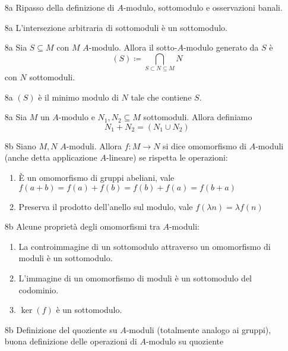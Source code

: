 \documentclass[italian]{article}
\begin{document}
    \begin{enumerate}
      \item[8a] Ripasso della definizione di $A$-modulo, sottomodulo e osservazioni 
        banali.
      \item[8a] L'intersezione arbitraria di sottomoduli è un sottomodulo.
      \item[8a] Sia $S \subseteq M$ con $M$ $A$-modulo. Allora il
        sotto-$A$-modulo generato da $S$ è 
            \begin{equation*}
              (S) \coloneqq \bigcap_{S \subset N \subseteq M} N
            \end{equation*}
        con $N$ sottomoduli. 
      \item[8a] $(S)$ è il minimo modulo di $N$ tale che contiene $S$.
      \item[8a] Sia $M$ un $A$-modulo e $N_1, N_2 \subseteq M$ sottomoduli.
        Allora definiamo 
        \begin{equation*}
          N_1 + N_2 = (N_1 \cup N_2)
        \end{equation*}
      \item[8b] Siano $M, N$ $A$-moduli. Allora $f \colon M \to N$ si dice
        omomorfismo di $A$-moduli (anche detta applicazione $A$-lineare) 
        se rispetta le operazioni:
        \begin{enumerate}
          \item È un omomorfismo di gruppi abeliani, vale 
                $f(a+b) = f(a)+f(b) = f(b)+f(a) = f(b+a)$
          \item Preserva il prodotto dell'anello sul modulo, vale
                $f(\lambda n) = \lambda f(n)$
        \end{enumerate}
      \item[8b] Alcune proprietà degli omomorfismi tra $A$-moduli:
        \begin{enumerate}
          \item La controimmagine di un sottomodulo attraverso un omomorfismo di
            moduli è un sottomodulo.
          \item L'immagine di un omomorfismo di moduli è un sottomodulo del
            codominio.
          \item $\ker(f)$ è un sottomodulo.
        \end{enumerate}           
      \item[8b] Definizione del quoziente su $A$-moduli (totalmente analogo ai
        gruppi), buona definizione delle operazioni di $A$-modulo su quoziente

\end{enumerate}
\end{document}
